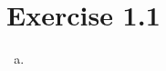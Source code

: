 \documentclass{article}
\begin{document}
\section*{Exercise 1.1}
\begin{enumerate}[(a)]
	\item 
\end{enumerate}
\end{document}
